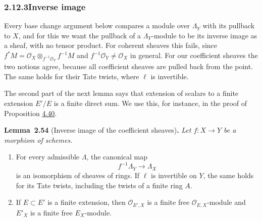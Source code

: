 \documentclass[11pt]{article}
\newenvironment{bpstatement}[2]{\par\addvspace{0.6\baselineskip}\noindent\textbf{#1}#2\textbf{.}\enspace\ignorespaces}
  {\par\addvspace{0.4\baselineskip}}
\newenvironment{bpstatementit}[2]{\begin{bpstatement}{#1}{#2}\itshape\ignorespaces}{\end{bpstatement}}
\begin{document}
\subsubsection*{\texorpdfstring{2.12.3\quad Inverse image}{2.12.3 Inverse image}}
\label{bp165}%
\label{bp166}%
Every base change argument below compares a module over \(\Lambda_Y\) with its pullback to \(X\), and for this we want the pullback of a \(\Lambda_Y\)-module to be its inverse image as a sheaf, with no tensor product. For coherent sheaves this fails, since \(f^*M=\mathcal O_X\otimes_{f^{-1}\mathcal O_Y}f^{-1}M\) and \(f^{-1}\mathcal O_Y\ne\mathcal O_X\) in general. For our coefficient sheaves the two notions agree, because all coefficient sheaves are pulled back from the point. The same holds for their Tate twists, where \(\ell\) is invertible.

The second part of the next lemma says that extension of scalars to a finite extension \(E'/E\) is a finite direct sum. We use this, for instance, in the proof of Proposition \hyperref[bp405]{4.40}.

\label{bp167}%
\begin{bpstatementit}{Lemma~2.54}{ (Inverse image of the coefficient sheaves)}
Let \(f:X\to Y\) be a morphism of schemes.

\begin{enumerate}
\item For every admissible \(\Lambda\), the canonical map \[
   f^{-1}\Lambda_Y\longrightarrow\Lambda_X
   \] is an isomorphism of sheaves of rings. If \(\ell\) is invertible on \(Y\), the same holds for its Tate twists, including the twists of a finite ring \(A\).
\item If \(E\subset E'\) is a finite extension, then \(\mathcal O_{E',X}\) is a finite free \(\mathcal O_{E,X}\)-module and \(E'_X\) is a finite free \(E_X\)-module.
\end{enumerate}
\end{bpstatementit}
\end{document}
